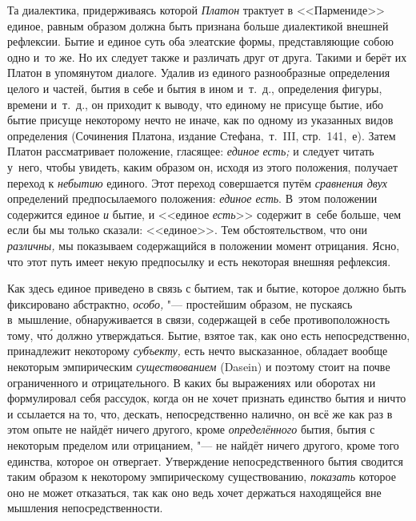 Та диалектика, придерживаясь которой {\em Платон} трактует в <<Пармениде>>
единое, равным образом должна быть признана больше диалектикой внешней
рефлексии. Бытие и единое суть оба элеатские формы, представляющие собою одно
и~то же. Но их следует также и различать друг от друга. Такими и берёт их
Платон в упомянутом диалоге. Удалив из единого разнообразные определения целого
и частей, бытия в себе и бытия в ином и~т.~д., определения фигуры, времени
и~т.~д., он приходит к выводу, что единому не присуще бытие, ибо бытие присуще
некоторому нечто не иначе, как по одному из указанных видов определения
(Сочинения Платона, издание Стефана,~т.~III, стр.~141,~е). Затем Платон
рассматривает положение, гласящее: {\em единое} {\em есть;} и следует читать
у~него, чтобы увидеть, каким образом он, исходя из этого положения, получает
переход к {\em небытию} единого. Этот переход совершается путём {\em сравнения
двух} определений предпосылаемого положения: {\em единое есть}. В~этом
положении содержится единое {\em и} бытие, и <<единое {\em есть}>> содержит в~себе
больше, чем если бы мы только сказали: <<единое>>. Тем обстоятельством, что они
{\em различны,} мы показываем содержащийся в положении момент отрицания. Ясно, что
этот путь имеет некую предпосылку и есть некоторая внешняя рефлексия.

Как здесь единое приведено в связь с бытием, так и бытие, которое должно быть
фиксировано абстрактно, {\em особо,} "--- простейшим образом, не пускаясь
в~мышление, обнаруживается в связи, содержащей в себе противоположность тому,
чт\'{о} должно утверждаться. Бытие, взятое так, как оно есть непосредственно,
принадлежит некоторому {\em субъекту,} есть нечто высказанное, обладает вообще
некоторым эмпирическим {\em существованием} (Dasein) и поэтому стоит на почве
ограниченного и отрицательного. В каких бы выражениях или оборотах ни
формулировал себя рассудок, когда он не хочет признать единство бытия и ничто и
ссылается на то, что, дескать, непосредственно налично, он всё же как раз в
этом опыте не найдёт ничего другого, кроме {\em определённого} бытия, бытия с
некоторым пределом или отрицанием, "--- не найдёт ничего другого, кроме того
единства, которое он отвергает. Утверждение непосредственного бытия сводится
таким образом к некоторому эмпирическому существованию, {\em показать} которое
оно не может отказаться, так как оно ведь хочет держаться находящейся вне
мышления непосредственности.

